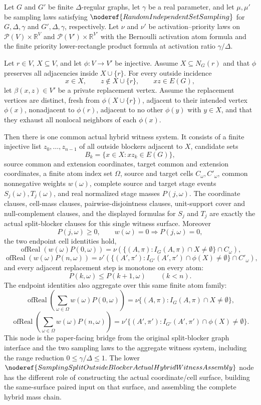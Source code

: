 \begin{helper}
Let \(G\) and \(G'\) be finite \(\Delta\)-regular graphs, let \(\gamma\) be a
real parameter, and let \(\mu,\mu'\) be sampling laws satisfying
\(\noderef{RandomIndependentSetSampling}\) for \(G,\Delta,\gamma\) and
\(G',\Delta,\gamma\), respectively.  Let \(\nu\) and \(\nu'\) be
activation--priority laws on
\(\mathcal P(V)\times\mathbb R^V\) and
\(\mathcal P(V')\times\mathbb R^{V'}\) with the Bernoulli activation atom
formula and the finite priority lower-rectangle product formula at activation
ratio \(\gamma/\Delta\).

Let \(r\in V\), \(X\subseteq V\), and let \(\phi:V\to V'\) be injective.
Assume \(X\subseteq N_G(r)\) and that \(\phi\) preserves all adjacencies inside
\(X\cup\{r\}\).  For every outside incidence
\[
  x\in X,\qquad z\notin X\cup\{r\},\qquad xz\in E(G),
\]
let \(\beta(x,z)\in V'\) be a private replacement vertex.  Assume the
replacement vertices are distinct, fresh from \(\phi(X\cup\{r\})\), adjacent
to their intended vertex \(\phi(x)\), nonadjacent to \(\phi(r)\), adjacent to
no other \(\phi(y)\) with \(y\in X\), and that they exhaust all nonlocal
neighbors of each \(\phi(x)\).

Then there is one common actual hybrid witness system.  It consists of a
finite injective list \(z_0,\ldots,z_{n-1}\) of all outside blockers adjacent
to \(X\), candidate sets
\[
  B_k=\{x\in X:xz_k\in E(G)\},
\]
source common and extension coordinates, target common and extension
coordinates, a finite atom index set \(\Omega\), source and target cells
\(C_\omega,C'_\omega\), common nonnegative weights \(w(\omega)\), complete
source and target stage events \(S_j(\omega),T_j(\omega)\), and real
normalized stage masses \(P(j,\omega)\).  The coordinate clauses, cell-mass
clauses, pairwise-disjointness clauses, unit-support cover and null-complement
clauses, and the displayed formulas for \(S_j\) and \(T_j\) are exactly the
actual split-blocker clauses for this single witness surface.  Moreover
\[
  P(j,\omega)\ge0,\qquad w(\omega)=0\Rightarrow P(j,\omega)=0,
\]
the two endpoint cell identities hold,
\[
\operatorname{ofReal}(w(\omega)P(0,\omega))
 =\nu(\{(A,\pi):I_G(A,\pi)\cap X\ne\emptyset\}\cap C_\omega),
\]
\[
\operatorname{ofReal}(w(\omega)P(n,\omega))
 =\nu'(\{(A',\pi'):I_{G'}(A',\pi')\cap\phi(X)\ne\emptyset\}\cap C'_\omega),
\]
and every adjacent replacement step is monotone on every atom:
\[
  P(k,\omega)\le P(k+1,\omega)\qquad(k<n).
\]
The endpoint identities also aggregate over this same finite atom family:
\[
  \operatorname{ofReal}\!\left(\sum_{\omega\in\Omega}w(\omega)P(0,\omega)\right)
  =
  \nu\{(A,\pi):I_G(A,\pi)\cap X\ne\emptyset\},
\]
\[
  \operatorname{ofReal}\!\left(\sum_{\omega\in\Omega}w(\omega)P(n,\omega)\right)
  =
  \nu'\{(A',\pi'):I_{G'}(A',\pi')\cap\phi(X)\ne\emptyset\}.
\]
This node is the paper-facing bridge from the original split-blocker graph
interface and the two sampling laws to the aggregate witness system, including
the range reduction \(0\le\gamma/\Delta\le1\).  The lower
\(\noderef{SamplingSplitOutsideBlockerActualHybridWitnessAssembly}\) node has
the different role of constructing the actual coordinate/cell surface,
building the same-surface paired input on that surface, and assembling the
complete hybrid mass chain.
\end{helper}
